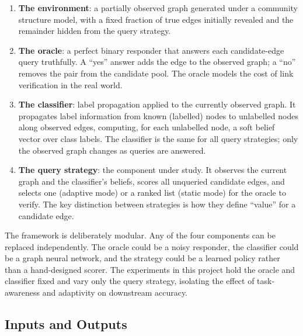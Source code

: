 \documentclass[11pt,a4paper]{article}
\begin{document}
\begin{enumerate}[leftmargin=2em]
\item \textbf{The environment}: a partially observed graph generated under a community
structure model, with a fixed fraction of true edges initially revealed and the remainder
hidden from the query strategy.

\item \textbf{The oracle}: a perfect binary responder that answers each candidate-edge query
truthfully. A ``yes'' answer adds the edge to the observed graph; a ``no'' removes the pair
from the candidate pool. The oracle models the cost of link verification in the real world.

\item \textbf{The classifier}: label propagation applied to the currently observed graph. It
propagates label information from known (labelled) nodes to unlabelled nodes along observed
edges, computing, for each unlabelled node, a soft belief vector over class labels. The
classifier is the same for all query strategies; only the observed graph changes as queries
are answered.

\item \textbf{The query strategy}: the component under study. It observes the current graph
and the classifier's beliefs, scores all unqueried candidate edges, and selects one (adaptive
mode) or a ranked list (static mode) for the oracle to verify. The key distinction between
strategies is how they define ``value'' for a candidate edge.
\end{enumerate}

The framework is deliberately modular. Any of the four components can be replaced
independently. The oracle could be a noisy responder, the classifier could be a graph neural
network, and the strategy could be a learned policy rather than a hand-designed scorer. The
experiments in this project hold the oracle and classifier fixed and vary only the query
strategy, isolating the effect of task-awareness and adaptivity on downstream accuracy.

\subsection{Inputs and Outputs}
\end{document}
